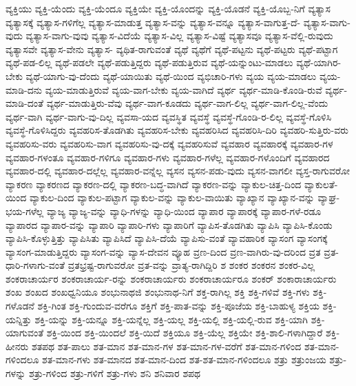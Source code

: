 {ವ್ಯಕ್ತಿಯು
ವ್ಯಕ್ತಿ-ಯೆಂದು
ವ್ಯಕ್ತಿ-ಯೆಂದೂ
ವ್ಯಕ್ತಿಯೇ
ವ್ಯಕ್ತಿ-ಯೊಂದನ್ನು
ವ್ಯಕ್ತಿ-ಯೊಡನೆ
ವ್ಯಕ್ತಿ-ಯೊಬ್ಬ-ನಿಗೆ
ವ್ಯತ್ಯಾಸ
ವ್ಯತ್ಯಾಸಕ್ಕೆ
ವ್ಯತ್ಯಾಸ-ಗಳಿಗೆಲ್ಲ
ವ್ಯತ್ಯಾಸ-ಮಾಡುತ್ತ
ವ್ಯತ್ಯಾಸ-ವನ್ನು
ವ್ಯತ್ಯಾಸ-ವನ್ನೂ
ವ್ಯತ್ಯಾಸ-ವಾಗುತ್ತ-ದೆ-
ವ್ಯತ್ಯಾಸ-ವಾಗು-ವುದು
ವ್ಯತ್ಯಾಸ-ವಾಗು-ವುವು
ವ್ಯತ್ಯಾಸ-ವಿದೆಯೆ
ವ್ಯತ್ಯಾಸ-ವಿಲ್ಲ
ವ್ಯತ್ಯಾಸ-ವಿಷ್ಟೆ
ವ್ಯತ್ಯಾಸವೂ
ವ್ಯತ್ಯಾಸ-ವೆಲ್ಲಿ-ರುವುದು
ವ್ಯತ್ಯಾಸವೇ
ವ್ಯತ್ಯಾಸ-ವೇನು
ವ್ಯತ್ಯಾಸ-
ವ್ಯಥಿತ-ರಾಗುವಂತೆ
ವ್ಯಥೆ
ವ್ಯಥೆಗೆ
ವ್ಯಥೆ-ಪಟ್ಟನು
ವ್ಯಥೆ-ಪಟ್ಟರು
ವ್ಯಥೆ-ಪಟ್ಟಾಗ
ವ್ಯಥೆ-ಪಡ-ಲಿಲ್ಲ
ವ್ಯಥೆ-ಪಡಲೇ
ವ್ಯಥೆ-ಪಡುತ್ತಿದ್ದರು
ವ್ಯಥೆ-ಪಡುತ್ತಿರುವ
ವ್ಯಥೆ-ಯನ್ನುಂಟು-ಮಾಡಲು
ವ್ಯಥೆ-ಯಾಗಿರ-ಬೇಕು
ವ್ಯಥೆ-ಯಾಗು-ವು-ದೆಂದು
ವ್ಯಥೆ-ಯಾಯಿತು
ವ್ಯಥೆ-ಯಿಂದ
ವ್ಯಭಿಚಾರಿ-ಗಳು
ವ್ಯಯ
ವ್ಯಯ-ಮಾಡಲು
ವ್ಯಯ-ಮಾಡಿ-ದನು
ವ್ಯಯ-ಮಾಡುತ್ತಿರುವೆ
ವ್ಯಯ-ವಾಗ-ಬೇಕು
ವ್ಯಯ-ವಾಗಿದೆ
ವ್ಯರ್ಥ
ವ್ಯರ್ಥ-ಮಾಡಿ-ಕೊಂಡಿ-ರುವೆ
ವ್ಯರ್ಥ-ಮಾಡಿ-ದಂತೆ
ವ್ಯರ್ಥ-ಮಾಡುತ್ತಿರು-ವೆವು
ವ್ಯರ್ಥ-ವಾಗ-ಕೂಡದು
ವ್ಯರ್ಥ-ವಾಗ-ಲಿಲ್ಲ
ವ್ಯರ್ಥ-ವಾಗ-ಲಿಲ್ಲ-ವೆಂದು
ವ್ಯರ್ಥ-ವಾಗಿ
ವ್ಯರ್ಥ-ವಾಗು-ವು-ದಿಲ್ಲ
ವ್ಯವಸಾ-ಯದ
ವ್ಯವಸ್ಥಿತ
ವ್ಯವಸ್ಥೆ
ವ್ಯವಸ್ಥೆ-ಗೊಂಡಿ-ರ-ಲಿಲ್ಲ
ವ್ಯವಸ್ಥೆ-ಗೊಳಿಸಿ
ವ್ಯವಸ್ಥೆ-ಗೊಳಿಸಿದ್ದರು
ವ್ಯವಹರಿಸ-ತೊಡಗಿತು
ವ್ಯವಹರಿಸ-ಬೇಕು
ವ್ಯವಹರಿಸಿದ
ವ್ಯವಹರಿಸಿ-ದಿರಿ
ವ್ಯವಹರಿ-ಸುತ್ತಿರು-ವರು
ವ್ಯವಹರಿಸು-ವರು
ವ್ಯವಹರಿಸು-ವಾಗ
ವ್ಯವಹರಿಸು-ವು-ದಕ್ಕೆ
ವ್ಯವಹರಿಸುವೆ
ವ್ಯವಹಾರ
ವ್ಯವಹಾರಕ್ಕೆ
ವ್ಯವಹಾರ-ಗಳ
ವ್ಯವಹಾರ-ಗಳಂತೂ
ವ್ಯವಹಾರ-ಗಳಿಗೂ
ವ್ಯವಹಾರ-ಗಳು
ವ್ಯವಹಾರ-ಗಳೆಲ್ಲ
ವ್ಯವಹಾರ-ಗಳೊಂದಿಗೆ
ವ್ಯವಹಾರದ
ವ್ಯವಹಾರ-ದಲ್ಲಿ
ವ್ಯವಹಾರ-ದಲ್ಲೆಲ್ಲ
ವ್ಯವಹಾರ-ವನ್ನೆಲ್ಲ
ವ್ಯಸನ
ವ್ಯಸನ-ಪಡು-ವುದು
ವ್ಯಸನ-ವಾಗಲೀ
ವ್ಯಸ್ತ-ರಾಗುವರೋ
ವ್ಯಾಕರಣ
ವ್ಯಾಕರಣದ
ವ್ಯಾಕರಣ-ದಲ್ಲಿ
ವ್ಯಾಕರಣ-ಬದ್ಧ-ವಾಗಿದೆ
ವ್ಯಾಕರಣ-ವನ್ನು
ವ್ಯಾಕುಲ-ಚಿತ್ತ-ದಿಂದ
ವ್ಯಾಕುಲತೆ-ಯಿಂದ
ವ್ಯಾಕುಲ-ದಿಂದ
ವ್ಯಾಕುಲ-ಪಟ್ಟಾಗ
ವ್ಯಾಕುಲ-ವನ್ನು
ವ್ಯಾಕುಲ-ವಾಯಿತು
ವ್ಯಾಖ್ಯಾನ
ವ್ಯಾಖ್ಯಾನ-ವನ್ನು
ವ್ಯಾಘ್ರ-ಭಯ-ಗಳೆಲ್ಲ
ವ್ಯಾಜ್ಯ
ವ್ಯಾಜ್ಯ-ವನ್ನು
ವ್ಯಾಧಿ-ಗಳನ್ನು
ವ್ಯಾಧಿ-ಯಿಂದ
ವ್ಯಾಪಾರ
ವ್ಯಾಪಾರಕ್ಕೆ
ವ್ಯಾಪಾರ-ಗಳೆ-ರಡೂ
ವ್ಯಾಪಾರದ
ವ್ಯಾಪಾರ-ವನ್ನು
ವ್ಯಾಪಾರಿ
ವ್ಯಾಪಾರಿ-ಗಳು
ವ್ಯಾಪಾರಿಗೆ
ವ್ಯಾಪಿಸ-ತೊಡಗಿತು
ವ್ಯಾಪಿಸಿ
ವ್ಯಾಪಿಸಿ-ಕೊಂಡು
ವ್ಯಾಪಿಸಿ-ಕೊಳ್ಳುತ್ತಿತ್ತು
ವ್ಯಾಪಿಸಿತು
ವ್ಯಾಪಿಸಿದೆ
ವ್ಯಾಪಿಸಿ-ದೆಯೆ
ವ್ಯಾಪಿಸು-ವಂತೆ
ವ್ಯಾವಹಾರಿಕ
ವ್ಯಾಸಂಗ
ವ್ಯಾಸಂಗಕ್ಕೆ
ವ್ಯಾಸಂಗ-ಮಾಡುತ್ತಿದ್ದರು
ವ್ಯಾಸಂಗ-ವನ್ನು
ವ್ಯಾಸ-ದೇವನ
ವ್ಯೂಹ
ವ್ರಣ-ದಿಂದ
ವ್ರಣ-ವಾಗಿರು-ವು-ದರಿಂದ
ವ್ರತ
ವ್ರತ-ಧಾರಿ-ಗಳಾಗು-ವಂತೆ
ವ್ರತಭ್ರಷ್ಟ-ರಾಗುವರೋ
ವ್ರತ-ವನ್ನು
ವ್ರಾತ್ಯ-ರಾಗಿದ್ದಿರಿ
ಶ
ಶಂಕರ
ಶಂಕರನ
ಶಂಕರ-ವಿಲ್ಲ
ಶಂಕರಾಚಾರ್ಯರ
ಶಂಕರಾಚಾರ್ಯ-ರನ್ನು
ಶಂಕರಾಚಾರ್ಯರು
ಶಂಕರಾಚಾರ್ಯರೂ
ಶಂಕರ್
ಶಂಕಾರಾಚಾರ್ಯರು
ಶಂಖ
ಶಂಖದ
ಶಂಖಧ್ವನಿಯೂ
ಶಂಭುನಾಥಜಿ
ಶಂಭುನಾಥ-ನಿಗೆ
ಶಕ್ತ-ರಾಗಿಲ್ಲ
ಶಕ್ತಿ
ಶಕ್ತಿ-ಗಳಿವೆ
ಶಕ್ತಿ-ಗಳು
ಶಕ್ತಿ-ಗಳೊಡನೆ
ಶಕ್ತಿ-ಗಿಂತ
ಶಕ್ತಿ-ಗುಂದುವ-ವರೆಗೂ
ಶಕ್ತಿಗೆ
ಶಕ್ತಿ-ಪಾತ-ವನ್ನು
ಶಕ್ತಿ-ಪೂಜೆಯ
ಶಕ್ತಿ-ಬಾಹುಳ್ಯ
ಶಕ್ತಿಯ
ಶಕ್ತಿ-ಯನ್ನಿತ್ತು
ಶಕ್ತಿ-ಯನ್ನು
ಶಕ್ತಿ-ಯನ್ನೂ
ಶಕ್ತಿ-ಯನ್ನೆಲ್ಲ
ಶಕ್ತಿ-ಯಲ್ಲ
ಶಕ್ತಿ-ಯಲ್ಲಿ
ಶಕ್ತಿ-ಯಲ್ಲಿ-ರುವ
ಶಕ್ತಿ-ಯಾಗಿ
ಶಕ್ತಿ-ಯಾಗುವಂತೆ
ಶಕ್ತಿ-ಯಿಂದ
ಶಕ್ತಿ-ಯಿಂದಲೆ
ಶಕ್ತಿ-ಯಿದೆ
ಶಕ್ತಿಯೂ
ಶಕ್ತಿ-ಯೆಲ್ಲ
ಶಕ್ತಿಯೇ
ಶಕ್ತಿ-ಶಾಲಿ-ಗಳಾಗಿದ್ದಾರೆ
ಶಕ್ತಿ-ಹೀನರು
ಶತಪಥ
ಶತ-ಪಾಲು
ಶತ-ಮಾನ
ಶತ-ಮಾನ-ಗಳ
ಶತ-ಮಾನ-ಗಳ-ವರೆಗೆ
ಶತ-ಮಾನ-ಗಳಿಂದ
ಶತ-ಮಾನ-ಗಳಿಂದಲೂ
ಶತ-ಮಾನ-ಗಳು
ಶತ-ಮಾನದ
ಶತ-ಮಾನ-ದಿಂದ
ಶತ-ಶತ-ಮಾನ-ಗಳಿಂದಲೂ
ಶತ್ರು
ಶತ್ರುಂಜಯ
ಶತ್ರು-ಗಳನ್ನು
ಶತ್ರು-ಗಳಿಂದ
ಶತ್ರು-ಗಳಿಗೆ
ಶತ್ರು-ಗಳು
ಶನಿ
ಶನಿವಾರ
ಶಪಥ
}
